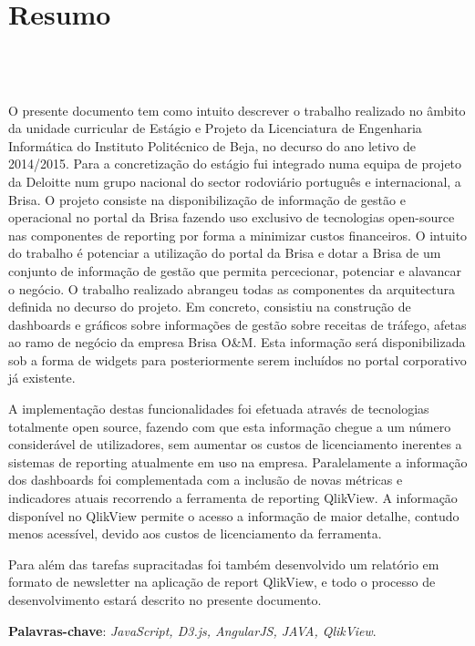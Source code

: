 \chapter{Resumo}
\section*{\textit{\TITULO}\\  {\small{\textit{\SUBTITULO}}}}

\par O presente documento tem como intuito descrever o trabalho realizado no âmbito da unidade curricular de Estágio e Projeto da Licenciatura de Engenharia Informática do Instituto Politécnico de Beja, no decurso do ano letivo de 2014/2015. Para a concretização do estágio fui integrado numa equipa de projeto da Deloitte num grupo nacional do sector rodoviário português e internacional, a Brisa. O projeto consiste na disponibilização de informação de gestão e operacional no portal da Brisa fazendo uso exclusivo de tecnologias open-source nas componentes de reporting por forma a minimizar custos financeiros. O intuito do trabalho é potenciar a utilização do portal da Brisa e dotar a Brisa de um conjunto de informação de gestão que permita percecionar, potenciar e alavancar o negócio. O trabalho realizado abrangeu todas as componentes da arquitectura definida no decurso do projeto. Em concreto, consistiu na construção de dashboards e gráficos sobre informações de gestão sobre receitas de tráfego, afetas ao ramo de negócio da empresa Brisa O\&M. Esta informação será disponibilizada sob a forma de widgets para posteriormente serem incluídos no portal corporativo já existente.
\par A implementação destas funcionalidades foi efetuada através de tecnologias totalmente open source, fazendo com que esta informação chegue a um número considerável de utilizadores, sem aumentar os custos de licenciamento inerentes a sistemas de reporting atualmente em uso na empresa. Paralelamente a informação dos dashboards foi complementada com a inclusão de novas métricas e indicadores atuais recorrendo a ferramenta de reporting QlikView. A informação disponível no QlikView permite o acesso a informação de maior detalhe, contudo menos acessível, devido aos custos de licenciamento da ferramenta.
\par Para além das tarefas supracitadas foi também desenvolvido um relatório em formato de newsletter na aplicação de report QlikView, e todo o processo de desenvolvimento estará descrito no presente documento.
\newline


\textbf{Palavras-chave}: \textit{JavaScript, D3.js, AngularJS, JAVA, QlikView}.